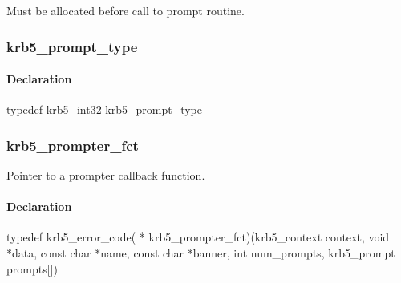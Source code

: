 \documentclass[letterpaper,10pt,english]{sphinxmanual}
\begin{document}

\begin{fulllineitems}
\label{appdev/refs/types/krb5_prompt:c.krb5_prompt.reply}
Must be allocated before call to prompt routine.

\end{fulllineitems}



\subsubsection{krb5\_prompt\_type}
\label{appdev/refs/types/krb5_prompt_type:krb5-prompt-type-struct}\label{appdev/refs/types/krb5_prompt_type:krb5-prompt-type}\label{appdev/refs/types/krb5_prompt_type::doc}

\begin{fulllineitems}
\label{appdev/refs/types/krb5_prompt_type:c.krb5_prompt_type}
\end{fulllineitems}



\paragraph{Declaration}
\label{appdev/refs/types/krb5_prompt_type:declaration}
typedef krb5\_int32 krb5\_prompt\_type


\subsubsection{krb5\_prompter\_fct}
\label{appdev/refs/types/krb5_prompter_fct:krb5-prompter-fct-struct}\label{appdev/refs/types/krb5_prompter_fct:krb5-prompter-fct}\label{appdev/refs/types/krb5_prompter_fct::doc}

\begin{fulllineitems}
\label{appdev/refs/types/krb5_prompter_fct:c.krb5_prompter_fct}
\end{fulllineitems}


Pointer to a prompter callback function.


\paragraph{Declaration}
\label{appdev/refs/types/krb5_prompter_fct:declaration}
typedef krb5\_error\_code( * krb5\_prompter\_fct)(krb5\_context context, void *data, const char *name, const char *banner, int num\_prompts, krb5\_prompt prompts{[}{]})
\end{document}
